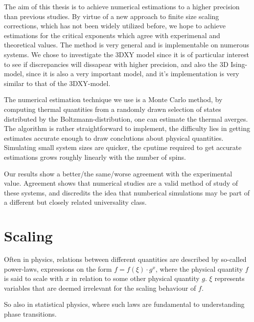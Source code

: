 The aim of this thesis is to achieve numerical estimations to a higher precision than previous studies. By virtue of a new approach to finite size scaling corrections, which has not been widely utilized before, we hope to achieve estimations for the critical exponents which agree with experimenal and theoretical values. The method is very general and is implementable on numerous systems. We chose to investigate the 3DXY model since it is of  particular interest to see if discrepancies will dissapear with higher precision, and also the 3D Ising-model, since it is also a very important model, and it's implementation is very similar to that of the 3DXY-model.

The numerical estimation technique we use is a Monte Carlo method, by computing thermal quantities from a randomly drawn selection of states distributed by the Boltzmann-distribution, one can estimate the thermal averges. The algorithm is rather straightforward to implement, the difficulty lies in getting estimates accurate enough to draw conclutions about physical quantities. Simulating small system sizes are quicker, the cputime required to get accurate estimations grows roughly linearly with the number of spins.

Our results show a better/the same/worse agreement with the experimental value. Agreement shows that numerical studies are a valid method of study of these systems, and discredits the idea that numberical simulations may be part of a different but closely related universality class.


\section{Scaling}
Often in physics, relations between different quantities are described by so-called power-laws, expressions on the form $f = f(\xi)\cdot g^{x}$, where the physical quantity $f$ is said to scale with $x$ in relation to some other physical quantity $g$. $\xi$ represents variables that are deemed irrelevant for the scaling behaviour of $f$.

So also in statistical physics, where such laws are fundamental to understanding phase transitions.

